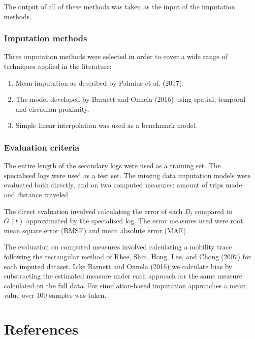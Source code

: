 \documentclass[english,man]{apa6}
\providecommand{\tightlist}{%
  \setlength{\itemsep}{0pt}\setlength{\parskip}{0pt}}
\theoremstyle{definition}
\theoremstyle{definition}
\theoremstyle{definition}
\theoremstyle{remark}
\begin{document}
The output of all of these methods was taken as the input of the
imputation methods.

\subsubsection{Imputation methods}\label{imputation-methods}

Three imputation methods were selected in order to cover a wide range of
techniques applied in the literature:

\begin{enumerate}
\def\labelenumi{\arabic{enumi}.}
\tightlist
\item
  Mean imputation as described by Palmius et al. (2017).
\item
  The model developed by Barnett and Onnela (2016) using spatial,
  temporal and circadian proximity.
\item
  Simple linear interpolation was used as a benchmark model.
\end{enumerate}

\subsubsection{Evaluation criteria}\label{evaluation-criteria}

The entire length of the secondary logs were used as a training set. The
specialised logs were used as a test set. The missing data imputation
models were evaluated both directly, and on two computed measures:
amount of trips made and distance traveled.

The direct evaluation involved calculating the error of each \(D_t\)
compared to \(G(t)\) approximated by the specialised log. The error
measures used were root mean square error (RMSE) and mean absolute error
(MAE).

The evaluation on computed measures involved calculating a mobility
trace following the rectangular method of Rhee, Shin, Hong, Lee, and
Chong (2007) for each imputed dataset. Like Barnett and Onnela (2016) we
calculate bias by substracting the estimated measure under each approach
for the same measure calculated on the full data. For simulation-based
imputation approaches a mean value over 100 samples was taken.

\newpage

\section{References}\label{references}
\end{document}

